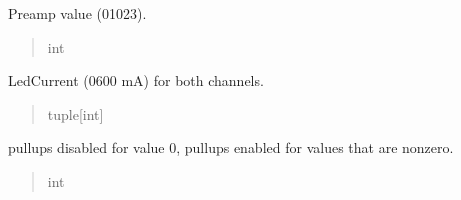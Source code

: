 \documentclass[letterpaper,10pt,english]{sphinxmanual}
\begin{document}
\begin{fulllineitems}
\begin{fulllineitems}
\begin{quote}
\begin{description}
\end{description}\end{quote}

\end{fulllineitems}


\begin{fulllineitems}
\label{\detokenize{Setup_PodParameters:Setup_PodParameters.Params_8480SC.preamp}}
\pysigstartsignatures
{}
\pysigstopsignatures
\sphinxAtStartPar
Preamp value (0\sphinxhyphen{}1023).
\begin{quote}\begin{description}
\sphinxAtStartPar
int

\end{description}\end{quote}

\end{fulllineitems}


\begin{fulllineitems}
\label{\detokenize{Setup_PodParameters:Setup_PodParameters.Params_8480SC.ledCurrent}}
\pysigstartsignatures
{}
\pysigstopsignatures
\sphinxAtStartPar
Led\sphinxhyphen{}Current (0\sphinxhyphen{}600 mA) for both channels.
\begin{quote}\begin{description}
\sphinxAtStartPar
tuple{[}int{]}

\end{description}\end{quote}

\end{fulllineitems}


\begin{fulllineitems}
\label{\detokenize{Setup_PodParameters:Setup_PodParameters.Params_8480SC.ttlPUllups}}
\pysigstartsignatures
{}
\pysigstopsignatures
\sphinxAtStartPar
pullups disabled for value 0, pullups enabled for values that are non\sphinxhyphen{}zero.
\begin{quote}\begin{description}
\sphinxAtStartPar
int


\end{description}
\end{quote}
\end{fulllineitems}
\end{fulllineitems}
\end{document}

